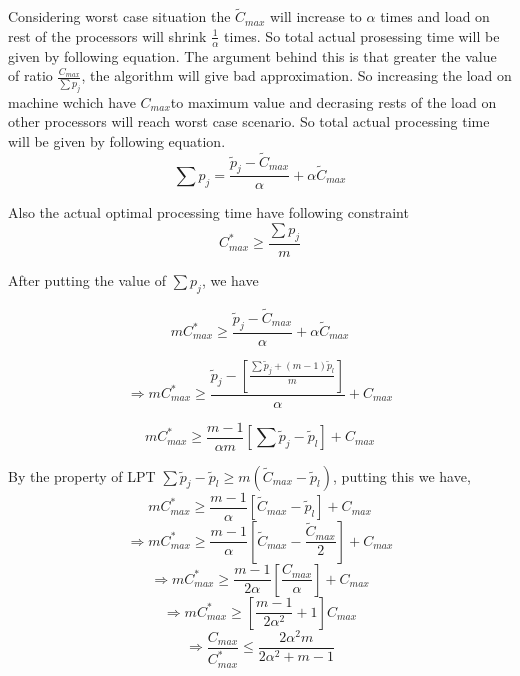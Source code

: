 \documentclass[10pt, conference, compsocconf]{IEEEtran}
\begin{document}
Considering worst case situation the $\tilde C_{max}$ will increase to $\alpha$ times and load on rest of the processors will shrink  $\frac{1}{\alpha}$ times. So total actual prosessing time will be given by following equation.  The argument behind this is that greater the value of ratio $\frac{C_{max}}{\sum{p_j}}$, the algorithm will give bad approximation. So increasing the load on machine wchich have $C_{max} $to maximum
value and decrasing rests of the load on other processors will reach worst case scenario. So total actual processing time will be given by following equation.
 \begin{equation}
 \sum {p_j} = \frac{\tilde p_j- \tilde C_{max}}{\alpha} + \alpha \tilde C_{max}
 \end{equation}
 
 Also the actual optimal processing time have following constraint
 \begin{equation}\nonumber 
C_{max}^{*}\geq \frac{\sum {p_j}}{m}
\end{equation}

After putting the value of  $ \sum {p_j}$, we have

 \begin{equation}\nonumber 
 m C_{max}^{*}\geq \frac{\tilde p_j- \tilde C_{max}}{\alpha} + \alpha \tilde C_{max}
 \end{equation}
 
\begin{equation}\nonumber 
\Rightarrow m C_{max}^{*}\geq \frac{\tilde p_j-[\frac{\sum{\tilde p_j + (m-1) \tilde p_l }}{m}]} {\alpha} + {C_{max}}
\end{equation}

\begin{equation}\nonumber
 m C_{max}^{*}\geq \frac{m-1}{\alpha m} [\sum \tilde p_j-\tilde p_l] + {C_{max}}
 \end{equation}

By the property of LPT $\sum \tilde p_j-\tilde p_l \geq m (\tilde C_{max}-\tilde p_l)$, putting this we have,\\
\begin{equation}\nonumber 
 m C_{max}^{*}\geq \frac{m-1}{\alpha } [\tilde C_{max}-\tilde p_l] + {C_{max}}
 \end{equation}
\begin{equation}\nonumber
\Rightarrow m C_{max}^{*}\geq \frac{m-1}{\alpha } [\tilde C_{max}-\frac{\tilde C_{max}}{2}] + {C_{max}}
\end{equation}
\begin{equation}\nonumber
\Rightarrow m C_{max}^{*}\geq \frac{m-1}{2\alpha } [\frac{C_{max}} {\alpha} ]+ {C_{max}}
\end{equation}
\begin{equation}\nonumber
\Rightarrow m C_{max}^{*}\geq[\frac{m-1}{2\alpha^{2} } +1]{C_{max}}
\end{equation}
\begin{equation}\nonumber
\Rightarrow \frac{C_{max}}{C_{max}^{*}}\leq \frac{2\alpha^{2}m}{2\alpha^{2}+ m-1}
\end{equation}
\end{document}
